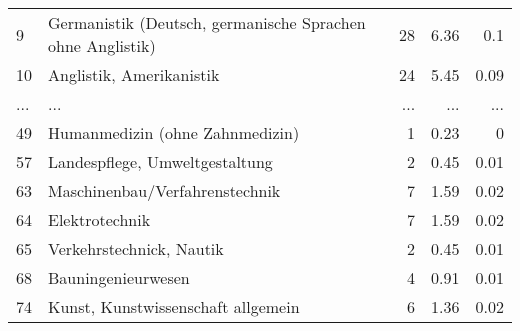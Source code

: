 \begin{longtable}{lXrrr}
        9 & \multicolumn{1}{X}{Germanistik (Deutsch, germanische Sprachen ohne Anglistik)} & %
          \num{28} &
          \num[round-mode=places,round-precision=2]{6.36} &
          \num[round-mode=places,round-precision=2]{0.1} \\
        10 & \multicolumn{1}{X}{Anglistik, Amerikanistik} & %
          \num{24} &
          \num[round-mode=places,round-precision=2]{5.45} &
          \num[round-mode=places,round-precision=2]{0.09} \\
       ... & ... & ... & ... & ... \\
        49 & \multicolumn{1}{X}{Humanmedizin (ohne Zahnmedizin)} & %
          \num{1} &
          \num[round-mode=places,round-precision=2]{0.23} &
          \num[round-mode=places,round-precision=2]{0} \\

        57 & \multicolumn{1}{X}{Landespflege, Umweltgestaltung} & %
          \num{2} &
          \num[round-mode=places,round-precision=2]{0.45} &
          \num[round-mode=places,round-precision=2]{0.01} \\

        63 & \multicolumn{1}{X}{Maschinenbau/Verfahrenstechnik} & %
          \num{7} &
          \num[round-mode=places,round-precision=2]{1.59} &
          \num[round-mode=places,round-precision=2]{0.02} \\

        64 & \multicolumn{1}{X}{Elektrotechnik} & %
          \num{7} &
          \num[round-mode=places,round-precision=2]{1.59} &
          \num[round-mode=places,round-precision=2]{0.02} \\

        65 & \multicolumn{1}{X}{Verkehrstechnick, Nautik} & %
          \num{2} &
          \num[round-mode=places,round-precision=2]{0.45} &
          \num[round-mode=places,round-precision=2]{0.01} \\

        68 & \multicolumn{1}{X}{Bauningenieurwesen} & %
          \num{4} &
          \num[round-mode=places,round-precision=2]{0.91} &
          \num[round-mode=places,round-precision=2]{0.01} \\

        74 & \multicolumn{1}{X}{Kunst, Kunstwissenschaft allgemein} & %
          \num{6} &
          \num[round-mode=places,round-precision=2]{1.36} &
          \num[round-mode=places,round-precision=2]{0.02} \\


\end{longtable}
